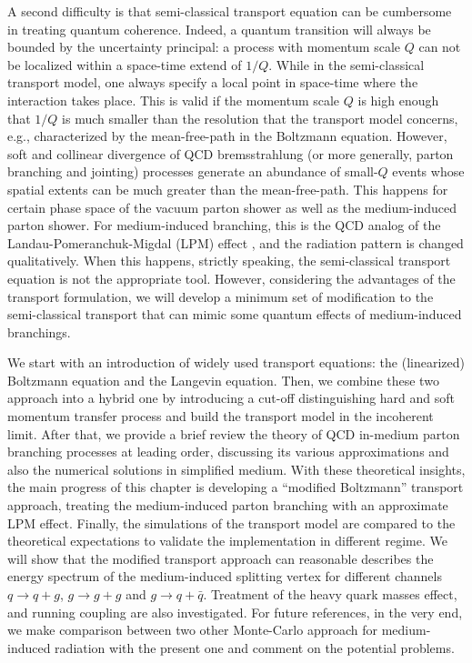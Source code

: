 A second difficulty is that semi-classical transport equation can be cumbersome in treating quantum coherence.
Indeed, a quantum transition will always be bounded by the uncertainty principal: a process with momentum scale $Q$ can not be localized within a space-time extend of $1/Q$.
While in the semi-classical transport model, one always specify a local point in space-time where the interaction takes place.
This is valid if the momentum scale $Q$ is high enough that $1/Q$ is much smaller than the resolution that the transport model concerns, e.g., characterized by the mean-free-path in the Boltzmann equation.
However, soft and collinear divergence of QCD bremsstrahlung (or more generally, parton branching and jointing) processes generate an abundance of small-$Q$ events whose spatial extents can be much greater than the mean-free-path. 
This happens for certain phase space of the vacuum parton shower as well as the medium-induced parton shower.
For medium-induced branching, this is the QCD analog of the Landau-Pomeranchuk-Migdal (LPM) effect \cite{PhysRev.103.1811,Wang:1994fx,Zakharov:1996fv}, and the radiation pattern is changed qualitatively.
When this happens, strictly speaking, the semi-classical transport equation is not the appropriate tool.
However, considering the advantages of the transport formulation, we will develop a minimum set of modification to the semi-classical transport that can mimic some quantum effects of medium-induced branchings.

We start with an introduction of widely used transport equations: the (linearized) Boltzmann equation and the Langevin equation.
Then, we combine these two approach into a hybrid one by introducing a cut-off distinguishing hard and soft momentum transfer process and build the transport model in the incoherent limit.
After that, we provide a brief review the theory of QCD in-medium parton branching processes at leading order, discussing its various approximations and also the numerical solutions in simplified medium.
With these theoretical insights, the main progress of this chapter is developing a ``modified Boltzmann'' transport approach, treating the medium-induced parton branching with an approximate LPM effect.
Finally, the simulations of the transport model are compared to the theoretical expectations to validate the implementation in different regime.
We will show that the modified transport approach can reasonable describes the energy spectrum of the medium-induced splitting vertex for different channels $q\rightarrow q+g$, $g\rightarrow g+g$ and $g\rightarrow q+\bar{q}$.
Treatment of the heavy quark masses effect, and running coupling are also  investigated.
For future references, in the very end, we make comparison between two other Monte-Carlo approach for medium-induced radiation with the present one and comment on the potential problems.

